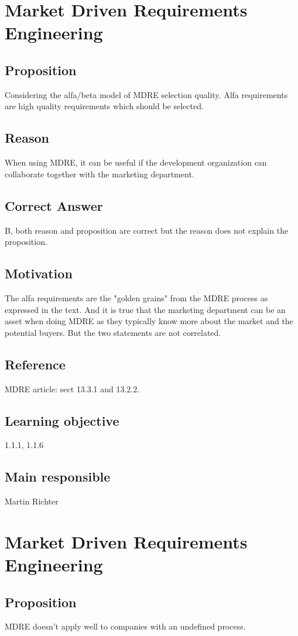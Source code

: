 \documentclass[a4paper]{article}
\begin{document}
\section{Market Driven Requirements Engineering}
\subsection*{Proposition}
Considering the alfa/beta model of MDRE selection quality. Alfa requirements are high quality requirements which should be selected.
\subsection*{Reason}
When using MDRE, it can be useful if the development organization can collaborate together with the marketing department.
\subsection*{Correct Answer}
B, both reason and proposition are correct but the reason does not explain the proposition.
\subsection*{Motivation}
The alfa requirements are the "golden grains" from the MDRE process as expressed in the text. And it is true that the marketing department can be an asset when doing MDRE as they typically know more about the market and the potential buyers. But the two statements are not correlated.
\subsection*{Reference}
MDRE article: sect 13.3.1 and 13.2.2.
\subsection*{Learning objective}
1.1.1, 1.1.6
\subsection*{Main responsible}
Martin Richter


\section{Market Driven Requirements Engineering}
\subsection*{Proposition}
MDRE doesn't apply well to companies with an undefined process.
\end{document}
